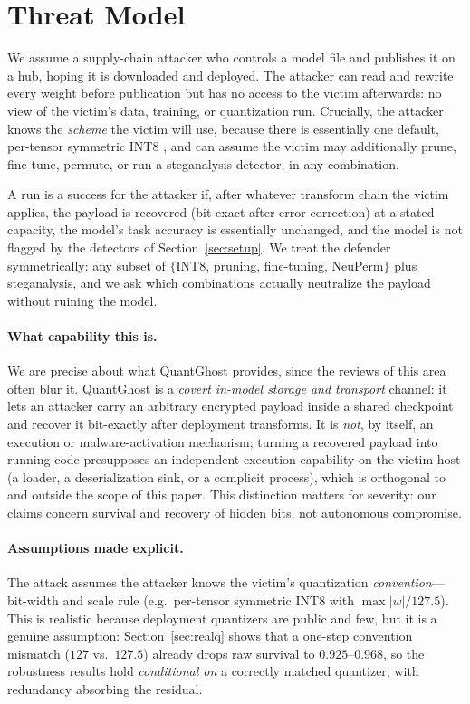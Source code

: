 \documentclass[a4paper,fleqn]{cas-dc}
\theoremstyle{plain}
\theoremstyle{remark}
\newcommand{\sys}{\mbox{QuantGhost}}
\begin{document}
\section{Threat Model}\label{sec:threat}
We assume a supply-chain attacker who controls a model file and publishes it on a hub,
hoping it is downloaded and deployed. The attacker can read and rewrite every weight
before publication but has no access to the victim afterwards: no view of the victim's
data, training, or quantization run. Crucially, the attacker knows the \emph{scheme}
the victim will use, because there is essentially one default, per-tensor symmetric
INT8 \cite{jacob2018quantization}, and can assume the victim may additionally
prune, fine-tune, permute, or run a steganalysis detector, in any combination.

A run is a success for the attacker if, after whatever transform chain the victim
applies, the payload is recovered (bit-exact after error correction) at a stated
capacity, the model's task accuracy is essentially unchanged, and the model is not
flagged by the detectors of Section~\ref{sec:setup}. We treat the defender
symmetrically: any subset of $\{$INT8, pruning, fine-tuning, NeuPerm$\}$ plus
steganalysis, and we ask which combinations actually neutralize the payload without
ruining the model.

\paragraph{What capability this is.} We are precise about what \sys{} provides, since the
reviews of this area often blur it. \sys{} is a \emph{covert in-model storage and transport}
channel: it lets an attacker carry an arbitrary encrypted payload inside a shared checkpoint
and recover it bit-exactly after deployment transforms. It is \emph{not}, by itself, an
execution or malware-activation mechanism; turning a recovered payload into running code
presupposes an independent execution capability on the victim host (a loader, a deserialization
sink, or a complicit process), which is orthogonal to and outside the scope of this paper. This
distinction matters for severity: our claims concern survival and recovery of hidden bits, not
autonomous compromise.

\paragraph{Assumptions made explicit.} The attack assumes the attacker knows the victim's
quantization \emph{convention}---bit-width and scale rule (e.g.\ per-tensor symmetric INT8 with
$\max|w|/127.5$). This is realistic because deployment quantizers are public and few, but it is a
genuine assumption: Section~\ref{sec:realq} shows that a one-step convention mismatch
($127$ vs.\ $127.5$) already drops raw survival to $0.925$--$0.968$, so the robustness results
hold \emph{conditional on} a correctly matched quantizer, with redundancy absorbing the residual.
\end{document}
